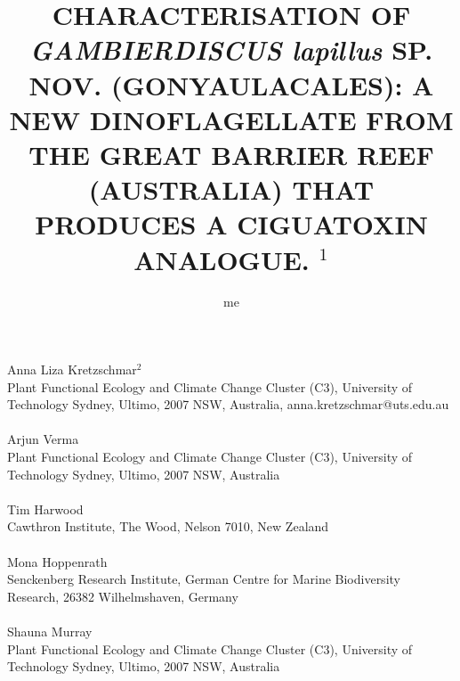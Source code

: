 \documentclass[12pt]{article}
\title{CHARACTERISATION OF \emph{GAMBIERDISCUS lapillus} SP. NOV. (GONYAULACALES): A NEW DINOFLAGELLATE FROM THE GREAT BARRIER REEF (AUSTRALIA) THAT PRODUCES A CIGUATOXIN ANALOGUE. $^{1}$}
\author{me}
\date{}
\begin{document}
\maketitle
\paragraph{}Anna Liza Kretzschmar$^{2}$\\
Plant Functional Ecology and Climate Change Cluster (C3), University of Technology Sydney, Ultimo, 2007 NSW, Australia, anna.kretzschmar@uts.edu.au
\paragraph{}Arjun Verma \\
Plant Functional Ecology and Climate Change Cluster (C3), University of Technology Sydney, Ultimo, 2007 NSW, Australia
\paragraph{}Tim Harwood\\ 
Cawthron Institute, The Wood, Nelson 7010, New Zealand
\paragraph{}Mona Hoppenrath\\
Senckenberg Research Institute, German Centre for Marine Biodiversity Research, 26382 Wilhelmshaven, Germany
\paragraph{}Shauna Murray\\ 
Plant Functional Ecology and Climate Change Cluster (C3), University of Technology Sydney, Ultimo, 2007 NSW, Australia
\newpage
\end{document}
